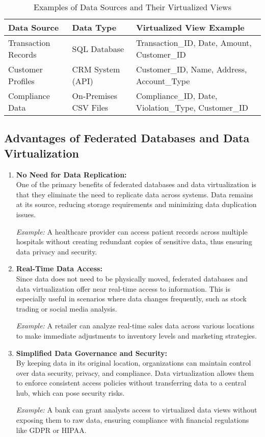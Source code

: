 \documentclass[12pt]{article}
\begin{document}
\begin{table}[H]
    \centering
    \begin{tabular}{|p{4cm}|p{4cm}|p{6cm}|}
        \hline
        \textbf{Data Source} & \textbf{Data Type} & \textbf{Virtualized View Example} \\ \hline
        Transaction Records & SQL Database & Transaction\_ID, Date, Amount, Customer\_ID \\ \hline
        Customer Profiles & CRM System (API) & Customer\_ID, Name, Address, Account\_Type \\ \hline
        Compliance Data & On-Premises CSV Files & Compliance\_ID, Date, Violation\_Type, Customer\_ID \\ \hline
    \end{tabular}
    \caption{Examples of Data Sources and Their Virtualized Views}
\end{table}

\subsection{Advantages of Federated Databases and Data Virtualization}
\begin{enumerate}
    \item \textbf{No Need for Data Replication:} \\
    One of the primary benefits of federated databases and data virtualization is that they eliminate the need to replicate data across systems. Data remains at its source, reducing storage requirements and minimizing data duplication issues.

    \textit{Example:} A healthcare provider can access patient records across multiple hospitals without creating redundant copies of sensitive data, thus ensuring data privacy and security.

    \item \textbf{Real-Time Data Access:} \\
    Since data does not need to be physically moved, federated databases and data virtualization offer near real-time access to information. This is especially useful in scenarios where data changes frequently, such as stock trading or social media analysis.

    \textit{Example:} A retailer can analyze real-time sales data across various locations to make immediate adjustments to inventory levels and marketing strategies.

    \item \textbf{Simplified Data Governance and Security:} \\
    By keeping data in its original location, organizations can maintain control over data security, privacy, and compliance. Data virtualization allows them to enforce consistent access policies without transferring data to a central hub, which can pose security risks.

    \textit{Example:} A bank can grant analysts access to virtualized data views without exposing them to raw data, ensuring compliance with financial regulations like GDPR or HIPAA.
\end{enumerate}
\end{document}
